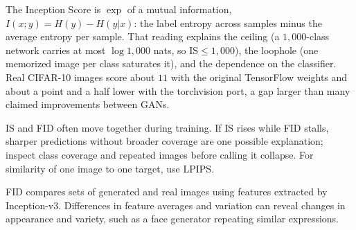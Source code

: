
{The Inception Score is $\exp$ of a mutual information, $I(x;y) = H(y) - H(y|x)$: the label entropy across samples minus the average
entropy per sample. That reading explains the ceiling (a $1{,}000$-class network carries at most $\log 1{,}000$ nats, so
$\text{IS} \leq 1{,}000$), the loophole (one memorized image per class saturates it), and the dependence on the classifier. Real
CIFAR-10 images score about $11$ with the original TensorFlow weights and about a point and a half lower with the torchvision port,
a gap larger than many claimed improvements between GANs.}

\metricsecondary

IS and FID often move together during training. If IS rises while FID stalls, sharper predictions without broader coverage are one
possible explanation; inspect class coverage and repeated images before calling it collapse. For similarity of one image to one target,
use LPIPS.

\metricend
\clearpage
\thispagestyle{genaistyle}
\label{sec:fid}


FID compares sets of generated and real images using features extracted by Inception-v3. Differences in feature averages and variation can reveal changes in appearance and variety, such as a face generator repeating similar expressions.

